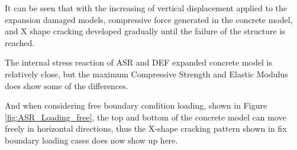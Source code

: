 It can be seen that with the increasing of vertical displacement applied to the expansion damaged models, compressive force generated in the concrete model,  and X shape cracking developed gradually until the failure of the structure is reached.

The internal stress reaction of ASR and DEF expanded concrete model is relatively close, but the maximum Compressive Strength and Elastic Modulus does show some of the differences.

And when considering free boundary condition loading, shown in Figure \ref{fig:ASR_Loading_free}, the top and bottom of the concrete model can move freely in horizontal directions, thus the X-shape cracking pattern shown in fix boundary loading cases does now show up here.


